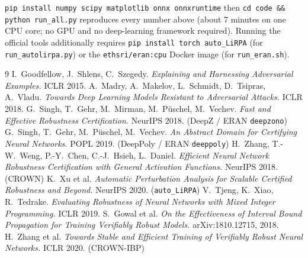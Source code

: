\documentclass[11pt,a4paper]{article}
\begin{document}
\noindent\sloppy
\texttt{pip install numpy scipy matplotlib onnx onnxruntime} then
\texttt{cd code \&\& python run\_all.py} reproduces every number above
(about 7 minutes on one CPU core; no GPU and no deep-learning framework
required). Running the official tools additionally requires
\texttt{pip install torch auto\_LiRPA} (for \texttt{run\_autolirpa.py}) or the
\texttt{ethsri/eran:cpu} Docker image (for \texttt{run\_eran.sh}).

\begin{thebibliography}{9}\small
{} I.~Goodfellow, J.~Shlens, C.~Szegedy.
\emph{Explaining and Harnessing Adversarial Examples.} ICLR 2015.
 A.~Madry, A.~Makelov, L.~Schmidt, D.~Tsipras, A.~Vladu.
\emph{Towards Deep Learning Models Resistant to Adversarial Attacks.} ICLR 2018.
 G.~Singh, T.~Gehr, M.~Mirman, M.~P\"uschel, M.~Vechev.
\emph{Fast and Effective Robustness Certification.} NeurIPS 2018. (DeepZ / ERAN \texttt{deepzono})
 G.~Singh, T.~Gehr, M.~P\"uschel, M.~Vechev.
\emph{An Abstract Domain for Certifying Neural Networks.} POPL 2019. (DeepPoly / ERAN \texttt{deeppoly})
 H.~Zhang, T.-W.~Weng, P.-Y.~Chen, C.-J.~Hsieh, L.~Daniel.
\emph{Efficient Neural Network Robustness Certification with General Activation Functions.} NeurIPS 2018. (CROWN)
 K.~Xu et al.
\emph{Automatic Perturbation Analysis for Scalable Certified Robustness and Beyond.} NeurIPS 2020. (\texttt{auto\_LiRPA})
 V.~Tjeng, K.~Xiao, R.~Tedrake.
\emph{Evaluating Robustness of Neural Networks with Mixed Integer Programming.} ICLR 2019.
 S.~Gowal et al.
\emph{On the Effectiveness of Interval Bound Propagation for Training Verifiably Robust Models.} arXiv:1810.12715, 2018.
 H.~Zhang et al.
\emph{Towards Stable and Efficient Training of Verifiably Robust Neural Networks.} ICLR 2020. (CROWN-IBP)
\end{thebibliography}
\end{document}
